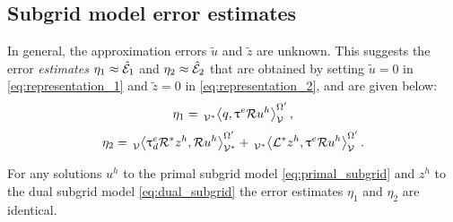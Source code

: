 \subsection{Subgrid model error estimates}

In general, the approximation errors $\tilde{u}$
and $\tilde{z}$ are unknown. This suggests the
error \emph{estimates} $\eta_1 \approx \hat{\mathcal{E}}_1$
and $\eta_2 \approx \hat{\mathcal{E}}_2$ that are obtained
by setting $\tilde{u} = 0$ in \eqref{eq:representation_1}
and $\tilde{z} = 0$ in \eqref{eq:representation_2}, and
are given below:
%
\begin{gather}
\eta_1 = \,{}_{\mathcal{V}^*}^{}\!\left< {q}, {\uptau^e \mathcal{R} u^h} \right>_{\mathcal{V}}^{\Omega'} ,
\label{eq:estimate_1}
\end{gather}
%
\begin{gather}
\eta_2 =
\,{}_{\mathcal{V}}^{}\!\left< {\uptau^e_d \mathcal{R}^* z^h}, {\mathcal{R} u^h} \right>_{\mathcal{V}^*}^{\Omega'} +
\,{}_{\mathcal{V}^*}^{}\!\left< {\mathcal{L}^* z^h}, {\uptau^e \mathcal{R} u^h} \right>_{\mathcal{V}}^{\Omega'}.
\label{eq:estimate_2}
\end{gather}

\begin{prop}
For any solutions $u^h$ to the primal subgrid model
\eqref{eq:primal_subgrid} and $z^h$ to the dual
subgrid model \eqref{eq:dual_subgrid} the error estimates
$\eta_1$ and $\eta_2$ are identical.
\end{prop}

